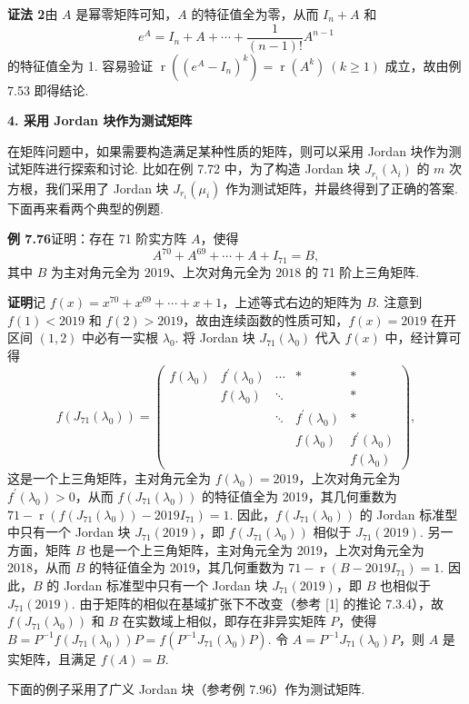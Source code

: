 \documentclass[UTF8,12pt,a4paper,fontset=fandol]{ctexart}
\begin{document}
\noindent\textbf{证法 2}\quad 由 $A$ 是幂零矩阵可知，$A$ 的特征值全为零，从而 $I_n+A$ 和
\[
e^A=I_n+A+\cdots+\frac1{(n-1)!}A^{n-1}
\]
的特征值全为 1. 容易验证 $\operatorname{r}((e^A-I_n)^k)=\operatorname{r}(A^k)\ (k\ge1)$ 成立，故由例 7.53 即得结论.

\noindent\textbf{4. 采用 Jordan 块作为测试矩阵}

在矩阵问题中，如果需要构造满足某种性质的矩阵，则可以采用 Jordan 块作为测试矩阵进行探索和讨论. 比如在例 7.72 中，为了构造 Jordan 块 $J_{r_i}(\lambda_i)$ 的 $m$ 次方根，我们采用了 Jordan 块 $J_{r_i}(\mu_i)$ 作为测试矩阵，并最终得到了正确的答案. 下面再来看两个典型的例题.

\noindent\textbf{例 7.76}\quad 证明：存在 71 阶实方阵 $A$，使得
\[
A^{70}+A^{69}+\cdots+A+I_{71}=B,
\]
其中 $B$ 为主对角元全为 $2019$、上次对角元全为 $2018$ 的 71 阶上三角矩阵.

\noindent\textbf{证明}\quad 记 $f(x)=x^{70}+x^{69}+\cdots+x+1$，上述等式右边的矩阵为 $B$. 注意到 $f(1)<2019$ 和 $f(2)>2019$，故由连续函数的性质可知，$f(x)=2019$ 在开区间 $(1,2)$ 中必有一实根 $\lambda_0$. 将 Jordan 块 $J_{71}(\lambda_0)$ 代入 $f(x)$ 中，经计算可得
\[
f(J_{71}(\lambda_0))=\left(\begin{array}{ccccc}
f(\lambda_0)&f^{\prime}(\lambda_0)&\cdots&*&*\\
&f(\lambda_0)&\ddots&&*\\
&&\ddots&f^{\prime}(\lambda_0)&*\\
&&&f(\lambda_0)&f^{\prime}(\lambda_0)\\
&&&&f(\lambda_0)
\end{array}\right),
\]
这是一个上三角矩阵，主对角元全为 $f(\lambda_0)=2019$，上次对角元全为 $f^{\prime}(\lambda_0)>0$，从而 $f(J_{71}(\lambda_0))$ 的特征值全为 2019，其几何重数为 $71-\operatorname{r}(f(J_{71}(\lambda_0))-2019I_{71})=1$. 因此，$f(J_{71}(\lambda_0))$ 的 Jordan 标准型中只有一个 Jordan 块 $J_{71}(2019)$，即 $f(J_{71}(\lambda_0))$ 相似于 $J_{71}(2019)$. 另一方面，矩阵 $B$ 也是一个上三角矩阵，主对角元全为 2019，上次对角元全为 2018，从而 $B$ 的特征值全为 2019，其几何重数为 $71-\operatorname{r}(B-2019I_{71})=1$. 因此，$B$ 的 Jordan 标准型中只有一个 Jordan 块 $J_{71}(2019)$，即 $B$ 也相似于 $J_{71}(2019)$. 由于矩阵的相似在基域扩张下不改变（参考 [1] 的推论 7.3.4），故 $f(J_{71}(\lambda_0))$ 和 $B$ 在实数域上相似，即存在非异实矩阵 $P$，使得 $B=P^{-1}f(J_{71}(\lambda_0))P=f(P^{-1}J_{71}(\lambda_0)P)$. 令 $A=P^{-1}J_{71}(\lambda_0)P$，则 $A$ 是实矩阵，且满足 $f(A)=B$.

下面的例子采用了广义 Jordan 块（参考例 7.96）作为测试矩阵.
\end{document}
